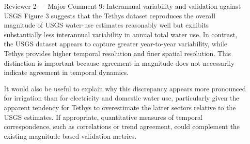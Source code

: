 \documentclass[11pt,letterpaper]{article}
\begin{document}
\begin{commentbox}[label={r2:maj9}]{Reviewer 2 --- Major Comment 9: Interannual variability and validation against USGS}
Figure 3 suggests that the Tethys dataset reproduces the overall magnitude of USGS water-use estimates reasonably well but exhibits substantially less interannual variability in annual total water use. In contrast, the USGS dataset appears to capture greater year-to-year variability, while Tethys provides higher temporal resolution and finer spatial resolution. This distinction is important because agreement in magnitude does not necessarily indicate agreement in temporal dynamics.

It would also be useful to explain why this discrepancy appears more pronounced for irrigation than for electricity and domestic water use, particularly given the apparent tendency for Tethys to overestimate the latter sectors relative to the USGS estimates. If appropriate, quantitative measures of temporal correspondence, such as correlations or trend agreement, could complement the existing magnitude-based validation metrics.
\end{commentbox}
\end{document}

